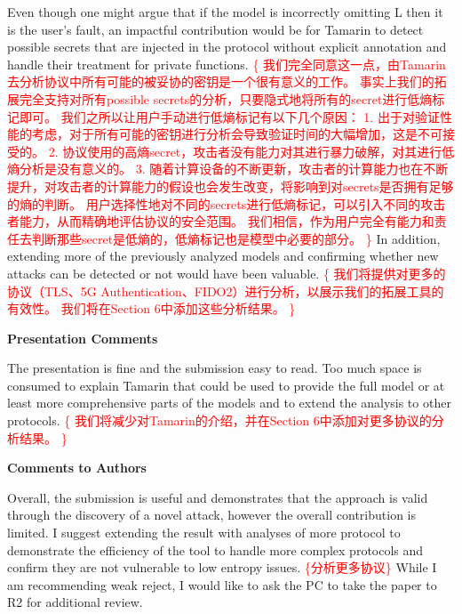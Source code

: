 \documentclass{article}
\newcommand{\response}[1]{\textcolor{red}{\{#1\}}}
\begin{document}
Even though one might argue that if the model is incorrectly omitting L then it is the user's fault, 
an impactful contribution would be for Tamarin to detect possible secrets that are injected in the protocol without explicit annotation and handle their treatment for private functions. 
\response{
    我们完全同意这一点，由Tamarin去分析协议中所有可能的被妥协的密钥是一个很有意义的工作。
    事实上我们的拓展完全支持对所有possible secrets的分析，只要隐式地将所有的secret进行低熵标记即可。
    我们之所以让用户手动进行低熵标记有以下几个原因：
    1. 出于对验证性能的考虑，对于所有可能的密钥进行分析会导致验证时间的大幅增加，这是不可接受的。
    2. 协议使用的高熵secret，攻击者没有能力对其进行暴力破解，对其进行低熵分析是没有意义的。
    3. 随着计算设备的不断更新，攻击者的计算能力也在不断提升，对攻击者的计算能力的假设也会发生改变，将影响到对secrets是否拥有足够的熵的判断。
        用户选择性地对不同的secrets进行低熵标记，可以引入不同的攻击者能力，从而精确地评估协议的安全范围。
    我们相信，作为用户完全有能力和责任去判断那些secret是低熵的，低熵标记也是模型中必要的部分。
}
In addition, extending more of the previously analyzed models and confirming whether new attacks can be detected or not would have been valuable.
\response{
    我们将提供对更多的协议（TLS、5G Authentication、FIDO2）进行分析，以展示我们的拓展工具的有效性。
    我们将在Section 6中添加这些分析结果。
}


\rule{0pt}{8pt}

\noindent\textbf{Presentation Comments}

The presentation is fine and the submission easy to read. 
Too much space is consumed to explain Tamarin that could be used to provide the full model or at least more comprehensive parts of the models and to extend the analysis to other protocols.
\response{
    我们将减少对Tamarin的介绍，并在Section 6中添加对更多协议的分析结果。
}

\rule{0pt}{8pt}

\noindent\textbf{Comments to Authors}

Overall, the submission is useful and demonstrates that the approach is valid through the discovery of a novel attack, however the overall contribution is limited. 
I suggest extending the result with analyses of more protocol to demonstrate the efficiency of the tool to handle more complex protocols and confirm they are not vulnerable to low entropy issues. 
\response{分析更多协议}
While I am recommending weak reject, I would like to ask the PC to take the paper to R2 for additional review.
\end{document}
